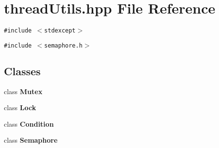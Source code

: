 \section{thread\-Utils.hpp File Reference}
\label{threadUtils_8hpp}
{\tt \#include $<$stdexcept$>$}\par
{\tt \#include $<$semaphore.h$>$}\par
\subsection*{Classes}
\begin{CompactItemize}
\item 
class {\bf Mutex}
\item 
class {\bf Lock}
\item 
class {\bf Condition}
\item 
class {\bf Semaphore}
\end{CompactItemize}
